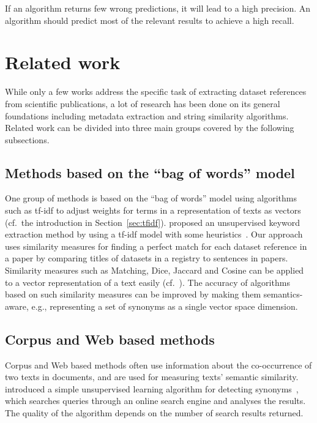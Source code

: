 \documentclass{IOS-Book-Article}
\begin{document}
If an algorithm returns few wrong predictions, it will lead to a high precision.
An algorithm should predict most of the relevant results to achieve a high recall.

\section{Related work}
\label{sec:relWork}
While only a few works address the specific task of extracting dataset references from scientific publications, a lot of research has been done on its general foundations including metadata extraction and string similarity algorithms. 
Related work can be divided into three main groups covered by the following subsections.
\subsection{Methods based on the “bag of words” model}
One group of methods is based on the “bag of words” model using algorithms such as tf-idf to adjust weights for terms in a representation of texts as vectors (cf.\ the introduction in Section~\ref{sec:tfidf}).
\citeauthor{Lee2008} proposed an unsupervised keyword extraction method by using a tf-idf model with some heuristics~\citeyearpar{Lee2008}.
Our approach uses similarity measures for finding a perfect match for each dataset reference in a paper by comparing titles of datasets in a registry to sentences in papers.
Similarity measures such as Matching, %
Dice, Jaccard and Cosine can be applied to a vector representation of a text easily (cf.~\citet{ChristopherD1999}).
The accuracy of algorithms based on such similarity measures can be improved by making them semantics-aware, e.g., representing a set of synonyms as a single vector space dimension.

\subsection{Corpus and Web based methods}
Corpus and Web based methods often use information about the co-occurrence of two texts in documents, and are used for measuring texts' semantic similarity.
\citeauthor{Turney2001} introduced a simple unsupervised learning algorithm for detecting synonyms~\citeyearpar{Turney2001}, which searches queries through an online search engine and analyses the results.
The quality of the algorithm depends on the number of search results returned.  
\end{document}
